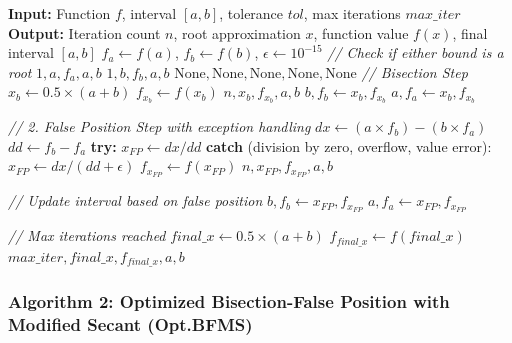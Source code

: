 \documentclass[amsmath, amssymb, aps]{revtex4-2}
\begin{document}
    \begin{algorithmic}[1]
    \State \textbf{Input:} Function $f$, interval $[a, b]$, tolerance $tol$, max iterations $max\_iter$
    \State \textbf{Output:} Iteration count $n$, root approximation $x$, function value $f(x)$, final interval $[a, b]$
    \State $f_a \gets f(a)$, $f_b \gets f(b)$, $\epsilon \gets 10^{-15}$
    \State \textit{// Check if either bound is a root}
        \State \Return $1, a, f_a, a, b$
    \EndIf
        \State \Return $1, b, f_b, a, b$
    \EndIf
        \State \Return $\text{None}, \text{None}, \text{None}, \text{None}, \text{None}$
    \EndIf
        \State \textit{// Bisection Step}
        \State $x_{b} \gets 0.5 \times (a + b)$
        \State $f_{x_b} \gets f(x_{b})$
            \State \Return $n, x_{b}, f_{x_b}, a, b$
        \EndIf
            \State $b, f_b \gets x_{b}, f_{x_b}$
        \Else
            \State $a, f_a \gets x_{b}, f_{x_b}$
        \EndIf
    
        \State \textit{// 2. False Position Step with exception handling}
        \State $dx \gets (a \times f_b) - (b \times f_a)$
        \State $dd \gets f_b - f_a$
        \State \textbf{try:}
        \State \quad $x_{FP} \gets dx / dd$
        \State \textbf{catch} (division by zero, overflow, value error):
        \State \quad $x_{FP} \gets dx / (dd + \epsilon)$
        \State $f_{x_{FP}} \gets f(x_{FP})$
            \State \Return $n, x_{FP}, f_{x_{FP}}, a, b$
        \EndIf
    
        \State \textit{// Update interval based on false position}
            \State $b, f_b \gets x_{FP}, f_{x_{FP}}$
        \Else
            \State $a, f_a \gets x_{FP}, f_{x_{FP}}$
        \EndIf

    \EndFor
    \State \textit{// Max iterations reached}
    \State $final\_x \gets 0.5 \times (a + b)$
    \State $f_{final\_x} \gets f(final\_x)$
    \State \Return $max\_iter, final\_x, f_{final\_x}, a, b$
    \end{algorithmic}

\subsubsection{Algorithm 2: Optimized Bisection-False Position with Modified Secant (Opt.BFMS)}
\end{document}

